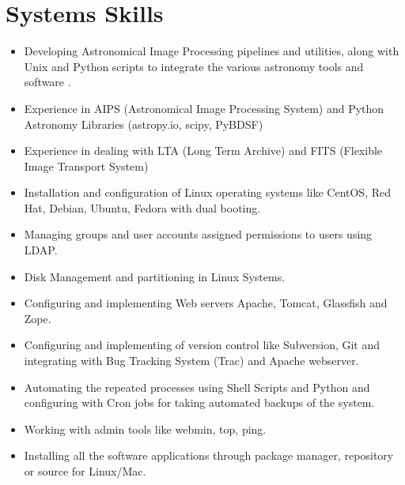 \documentclass[11pt,a4paper,sans]{moderncv}        %
\begin{document}
\section{Systems Skills}
\begin{itemize}
\item Developing Astronomical Image Processing pipelines and utilities, along with Unix and Python scripts to integrate the various astronomy tools and software .
\item Experience in AIPS (Astronomical Image Processing System) and Python Astronomy Libraries (astropy.io, scipy, PyBDSF) 
\item Experience in dealing with LTA (Long Term Archive) and FITS (Flexible Image Transport System)
\item Installation and configuration of Linux operating systems like CentOS, Red Hat, Debian, Ubuntu, Fedora with dual booting.
\item Managing groups and user accounts assigned permissions to users using LDAP.
\item Disk Management and partitioning in Linux Systems.
\item Configuring and implementing Web servers Apache, Tomcat, Glassfish and Zope.
\item Configuring and implementing of version control like Subversion, Git and integrating with Bug Tracking
System (Trac) and Apache webserver.
\item Automating the repeated processes using Shell Scripts and Python and configuring with Cron jobs for taking automated backups of the system.
\item Working with admin tools like webmin, top, ping.
\item Installing all the software applications through package manager, repository or source for Linux/Mac.
\end{itemize}
\pagebreak
~\\
\end{document}

